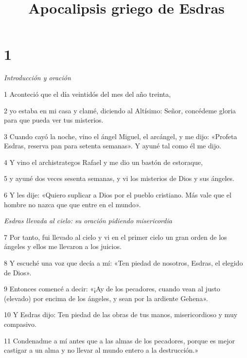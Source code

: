 

\title{Apocalipsis griego de Esdras}

\chapter{1}

\par \textit{Introducción y oración}

\par 1 Aconteció que el día veintidós del mes del año treinta, 

\par 2 yo estaba en mi casa y clamé, diciendo al Altísimo: Señor, concédeme gloria para que pueda ver tus misterios.


\par 3 Cuando cayó la noche, vino el ángel Miguel, el arcángel, y me dijo: «Profeta Esdras, reserva pan para setenta semanas». Y ayuné tal como él me dijo.

\par 4 Y vino el archistrategos Rafael y me dio un bastón de estoraque, 

\par 5 y ayuné dos veces sesenta semanas, y vi los misterios de Dios y sus ángeles.

\par 6 Y les dije: «Quiero suplicar a Dios por el pueblo cristiano. Más vale que el hombre no nazca que que entre en el mundo».

\par \textit{Esdras llevada al cielo: su oración pidiendo misericordia}

\par 7 Por tanto, fui llevado al cielo y vi en el primer cielo un gran orden de los ángeles y ellos me llevaron a los juicios.

\par 8 Y escuché una voz que decía a mí: «Ten piedad de nosotros, Esdras, el elegido de Dios».

\par 9 Entonces comencé a decir: «¡Ay de los pecadores, cuando vean al justo (elevado) por encima de los ángeles, y sean por la ardiente Gehena».

\par 10 Y Esdras dijo: Ten piedad de las obras de tus manos, misericordioso y muy compasivo.

\par 11 Condenadme a mí antes que a las almas de los pecadores, porque es mejor castigar a un alma y no llevar al mundo entero a la destrucción.»

